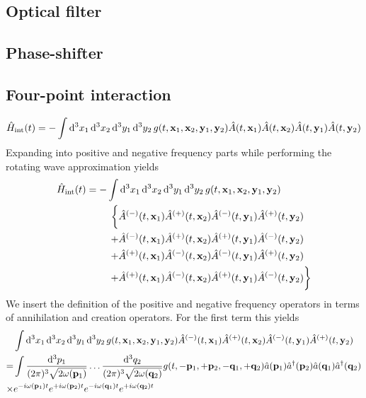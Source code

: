 \subsection{Optical filter}

\subsection{Phase-shifter}

\subsection{Four-point interaction}

\begin{equation}
	\hat{H}_\text{int}(t)
	=
	-
	\int\dd[3]{x_1}\dd[3]{x_2}\dd[3]{y_1}\dd[3]{y_2}
	g(t,\vb{x}_1,\vb{x}_2,\vb{y}_1,\vb{y}_2)
	\hat{A}(t,\vb{x}_1)
	\hat{A}(t,\vb{x}_2)
	\hat{A}(t,\vb{y}_1)
	\hat{A}(t,\vb{y}_2)
\end{equation}
Expanding into positive and negative frequency parts while performing the rotating wave approximation yields
\begin{equation}
	\begin{split}
		\hat{H}_\text{int}(t)
		=
		-
		\int &
		\dd[3]{x_1}\dd[3]{x_2}\dd[3]{y_1}\dd[3]{y_2}
		g(t,\vb{x}_1,\vb{x}_2,\vb{y}_1,\vb{y}_2)
		\\
		\biggl\{
			&
			\hat{A}^{(-)}(t,\vb{x}_1)
			\hat{A}^{(+)}(t,\vb{x}_2)
			\hat{A}^{(-)}(t,\vb{y}_1)
			\hat{A}^{(+)}(t,\vb{y}_2)
			\\
			+&
			\hat{A}^{(-)}(t,\vb{x}_1)
			\hat{A}^{(+)}(t,\vb{x}_2)
			\hat{A}^{(+)}(t,\vb{y}_1)
			\hat{A}^{(-)}(t,\vb{y}_2)
			\\
			+&
			\hat{A}^{(+)}(t,\vb{x}_1)
			\hat{A}^{(-)}(t,\vb{x}_2)
			\hat{A}^{(-)}(t,\vb{y}_1)
			\hat{A}^{(+)}(t,\vb{y}_2)
			\\
			+&
			\hat{A}^{(+)}(t,\vb{x}_1)
			\hat{A}^{(-)}(t,\vb{x}_2)
			\hat{A}^{(+)}(t,\vb{y}_1)
			\hat{A}^{(-)}(t,\vb{y}_2)
		\biggr\}
	\end{split}
\end{equation}
We insert the definition of the positive and negative frequency operators in terms of annihilation and creation operators.
For the first term this yields
\begin{equation}
	\begin{split}
		&
		\int\dd[3]{x_1}\dd[3]{x_2}\dd[3]{y_1}\dd[3]{y_2}
		g(t,\vb{x}_1,\vb{x}_2,\vb{y}_1,\vb{y}_2)
		\hat{A}^{(-)}(t,\vb{x}_1)
		\hat{A}^{(+)}(t,\vb{x}_2)
		\hat{A}^{(-)}(t,\vb{y}_1)
		\hat{A}^{(+)}(t,\vb{y}_2)
		\\
		=&
		\int
		\frac{\dd[3]{p_1}}{(2\pi)^3\sqrt{2\omega(\vb{p}_1)}}
		\dots
		\frac{\dd[3]{q_2}}{(2\pi)^3\sqrt{2\omega(\vb{q}_2)}}
		g(t,-\vb{p}_1,+\vb{p}_2,-\vb{q}_1,+\vb{q}_2)
		\hat{a}(\vb{p}_1)
		\hat{a}^\dagger(\vb{p}_2)
		\hat{a}(\vb{q}_1)
		\hat{a}^\dagger(\vb{q}_2)
		\\
		\times&
		e^{-i\omega(\vb{p}_1)t}
		e^{+i\omega(\vb{p}_2)t}
		e^{-i\omega(\vb{q}_1)t}
		e^{+i\omega(\vb{q}_2)t}
	\end{split}
\end{equation}
